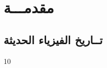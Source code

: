 \chapter*{مقدمـــة} %
\label{Chapter0} 
\renewcommand{\theequation}{\arabic{chapter}.\arabic{equation}}

\newcommand{\keyword}[1]{\textbf{#1}}
\newcommand{\tabhead}[1]{\textbf{#1}}
\newcommand{\code}[1]{\texttt{#1}}


\section*{تــاريخ الفيزياء الحديثة}

10


